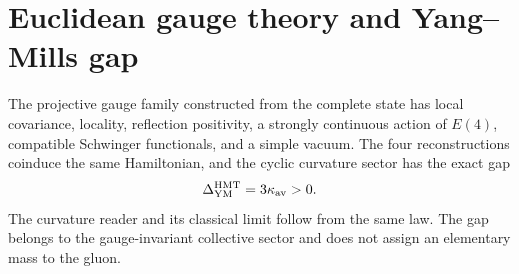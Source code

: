 \section{Euclidean gauge theory and Yang--Mills gap}

The projective gauge family constructed from the complete state has local covariance, locality, reflection positivity, a strongly continuous action of \(E(4)\), compatible Schwinger functionals, and a simple vacuum. The four reconstructions coinduce the same Hamiltonian, and the cyclic curvature sector has the exact gap
\[
  \Delta_{\rm YM}^{\rm HMT}=3\kappa_{\rm av}>0.
\]
The curvature reader and its classical limit follow from the same law. The gap
belongs to the gauge-invariant collective sector and does not assign an elementary mass
to the gluon.



